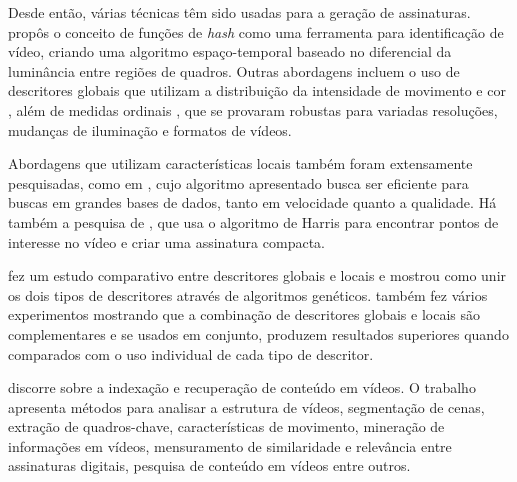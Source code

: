 Desde então, várias técnicas têm sido usadas para a geração de assinaturas. \citeauthor{coskun2006spatio} propôs o conceito de funções de \textit{hash} como uma ferramenta para identificação de vídeo, criando uma algoritmo espaço-temporal baseado no diferencial da luminância entre regiões de quadros. Outras abordagens incluem o uso de descritores globais que utilizam a distribuição da intensidade de movimento e cor \citeauthor{hampapur2001comparison}, além de medidas ordinais \citeauthor{hua2004robust}, que se provaram robustas para variadas resoluções, mudanças de iluminação e formatos de vídeos.	   	

Abordagens que utilizam características locais também foram extensamente pesquisadas, como em \citeauthor{joly2007content}, cujo algoritmo apresentado busca ser eficiente para buscas em grandes bases de dados, tanto em velocidade quanto a qualidade. Há também a  pesquisa de \citeauthor{law2006robust}, que usa o algoritmo de Harris para encontrar pontos de interesse no vídeo e criar uma assinatura compacta.

\citeauthor{de2012combinaccao} fez um estudo comparativo entre descritores globais e locais e mostrou como unir os dois tipos de descritores através de algoritmos genéticos. \citeauthor{de2012combinaccao} também fez vários experimentos mostrando que a combinação de descritores globais e locais são complementares e se usados em conjunto, produzem resultados superiores quando comparados com o uso individual de cada tipo de descritor.

\citeauthor{hu2011survey} discorre sobre a indexação e recuperação de conteúdo em vídeos. O trabalho apresenta métodos para analisar a estrutura de vídeos, segmentação de cenas, extração de quadros-chave, características de movimento, mineração de informações em vídeos, mensuramento de similaridade e relevância entre assinaturas digitais, pesquisa de conteúdo em vídeos entre outros.

